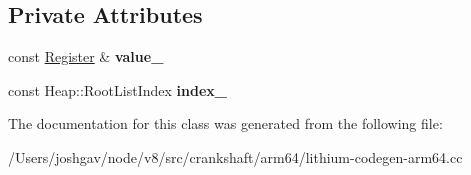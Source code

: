 \subsection*{Private Attributes}
\begin{DoxyCompactItemize}
\item 
const \hyperlink{structv8_1_1internal_1_1_register}{Register} \& {\bfseries value\+\_\+}\hypertarget{classv8_1_1internal_1_1_branch_if_root_abd9e874ce63dbb5f6baf9ab3121759f6}{}\label{classv8_1_1internal_1_1_branch_if_root_abd9e874ce63dbb5f6baf9ab3121759f6}

\item 
const Heap\+::\+Root\+List\+Index {\bfseries index\+\_\+}\hypertarget{classv8_1_1internal_1_1_branch_if_root_a1ccd4b01838399d4c6023d97c81ecb1d}{}\label{classv8_1_1internal_1_1_branch_if_root_a1ccd4b01838399d4c6023d97c81ecb1d}

\end{DoxyCompactItemize}


The documentation for this class was generated from the following file\+:\begin{DoxyCompactItemize}
\item 
/\+Users/joshgav/node/v8/src/crankshaft/arm64/lithium-\/codegen-\/arm64.\+cc\end{DoxyCompactItemize}
